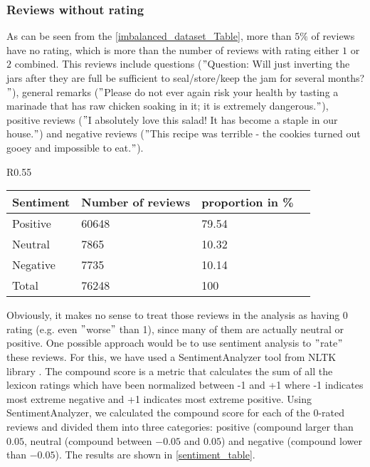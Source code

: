 \documentclass{article}
\begin{document}
\subsubsection{Reviews without rating}
\label{Reviews without rating}
As can be seen from the \ref{imbalanced_dataset_Table}, more than $5\%$ of reviews have no rating, which is more than the number of reviews with rating either $1$ or $2$ combined. This reviews include questions ($"$Question: Will just inverting the jars after they are full be sufficient to seal/store/keep the jam for several months?$"$), general remarks ($"$Please do not ever again risk your health by tasting a marinade that has raw chicken soaking in it; it is extremely dangerous.$"$), positive reviews ($"$I absolutely love this salad! It has become a staple in our house.$"$) and negative reviews ($"$This recipe was terrible - the cookies turned out gooey and impossible to eat.$"$).\\ 
\begin{wrapfigure}{R}{0.55\textwidth}
    \centering
\begin{tabular}{|l|l|l|l|}
\hline
Sentiment & Number of reviews & proportion in \%   \\ \hline
Positive & 60648  & 79.54 \\ \hline
Neutral & 7865 & 10.32 \\ \hline
Negative & 7735 & 10.14 \\ \hline
Total & 76248 & 100 \\ \hline
\end{tabular}
\caption{\label{sentiment_table}Sentiment distribution.}
\end{wrapfigure}
Obviously, it makes no sense to treat those reviews in the analysis as having $0$ rating (e.g. even $"$worse$"$ than 1), since many of them are actually neutral or positive. One possible approach would be to use sentiment analysis to $"$rate$"$ these reviews. For this, we have used a SentimentAnalyzer tool from NLTK library \cite{bird2009natural}. The compound score is a metric that calculates the sum of all the lexicon ratings which have been normalized between -1 and +1 where -1 indicates most extreme negative and +1 indicates most extreme positive\cite{bonta2019comprehensive}. Using SentimentAnalyzer, we calculated the compound score for each of the $0$-rated reviews and divided them into three categories: positive (compound larger than $0.05$, neutral (compound between $-0.05$ and $0.05$) and negative (compound lower than $-0.05$). The results are shown in \ref{sentiment_table}.
\end{document}
